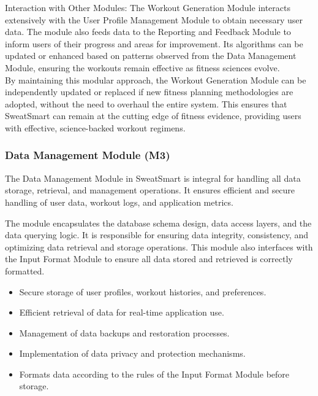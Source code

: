 \documentclass[12pt, titlepage]{article}
\begin{document}
Interaction with Other Modules: The Workout Generation Module interacts extensively with the User Profile Management Module to obtain necessary user data. The module also feeds data to the Reporting and Feedback Module to inform users of their progress and areas for improvement. Its algorithms can be updated or enhanced based on patterns observed from the Data Management Module, ensuring the workouts remain effective as fitness sciences evolve.
\\

By maintaining this modular approach, the Workout Generation Module can be independently updated or replaced if new fitness planning methodologies are adopted, without the need to overhaul the entire system. This ensures that SweatSmart can remain at the cutting edge of fitness evidence, providing users with effective, science-backed workout regimens.

\subsubsection{Data Management Module (M3)}

The Data Management Module in SweatSmart is integral for handling all data storage, retrieval, and management operations. It ensures efficient and secure handling of user data, workout logs, and application metrics.

\begin{description}[leftmargin=0pt]
\item[Secrets:] 
The module encapsulates the database schema design, data access layers, and the data querying logic. It is responsible for ensuring data integrity, consistency, and optimizing data retrieval and storage operations. This module also interfaces with the Input Format Module to ensure all data stored and retrieved is correctly formatted.
\end{description}

\begin{description}[leftmargin=0pt]
\item[Services:] 
\end{description}
\begin{itemize}[leftmargin=*]
\item Secure storage of user profiles, workout histories, and preferences.
\item Efficient retrieval of data for real-time application use.
\item Management of data backups and restoration processes.
\item Implementation of data privacy and protection mechanisms.
\item Formats data according to the rules of the Input Format Module before storage.
\end{itemize}
\end{document}

